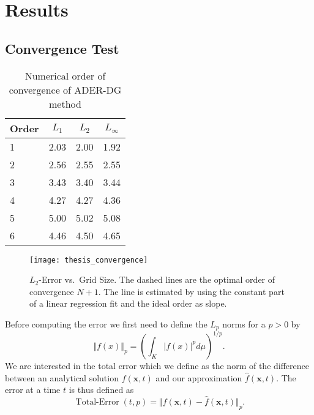 \chapter{Results}\label{chap:results}
\section{Convergence Test}\label{sec:results-convergence}
\begin{table}[htb]
  \centering
\caption{Numerical order of convergence of ADER-DG method}%
\label{tab:convergence-order}
\begin{tabular}{@{}lS[table-format=1.2]S[table-format=1.2]S[table-format=1.2]@{}}
\toprule
{Order} & {$L_1$} & {$L_2$} & {$L_\infty$}\\  & 2.03 & 2.00 & 1.92\\
2 & 2.56 & 2.55 & 2.55\\
3 & 3.43 & 3.40 & 3.44\\
4 & 4.27 & 4.27 & 4.36\\
5 & 5.00 & 5.02 & 5.08\\
6 & 4.46 & 4.50 & 4.65\\
\bottomrule
\end{tabular}
\end{table}

\begin{figure}[htb]
  \centering
  \texttt{[image: thesis\_convergence]}
  \caption{$L_2$-Error vs.\ Grid Size.
    The dashed lines are the optimal order of convergence $N+1$.
  The line is estimated by using the constant part of a linear regression fit and the ideal order as slope.}
  \label{fig:convergence-l2-error}
\end{figure}

\newcommand{\error}{\operatorname{Total-Error}}

Before computing the error we first need to define the $L_p$ norms for a $p > 0$ by
\begin{equation}
  \label{eq:Lp-nrom}
  \Vert f(x) \Vert_p = \left( \int_K \vert f(x) \vert^p d\mu  \right)^{1/p}.
\end{equation}
We are interested in the total error which we define as the norm of the difference between an analytical solution $f(\bm{x}, t)$ and our approximation $\hat{f}(\bm{x}, t)$.
The error at a time $t$ is thus defined as
\begin{equation}
  \label{eq:error}
  \error(t,p) = \Vert f(\bm{x}, t) - \hat{f}(\bm{x}, t) \Vert_p.
\end{equation}

